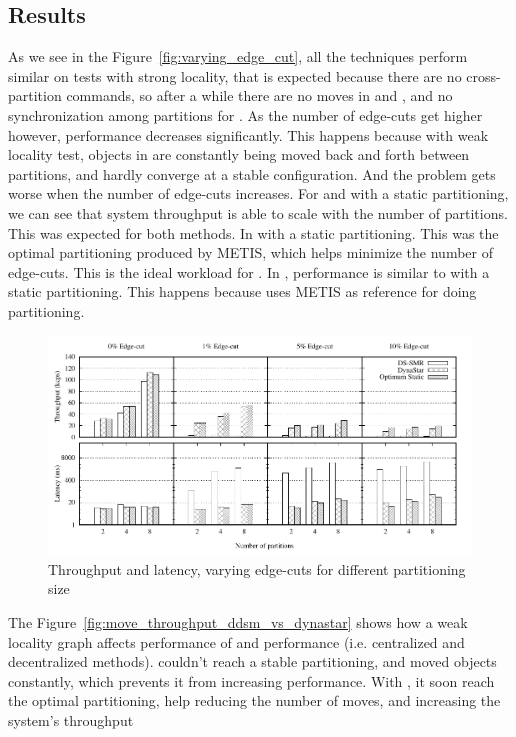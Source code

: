 \subsection{Results}
As we see in the Figure~\ref{fig:varying_edge_cut}, all the techniques perform similar on tests with strong locality, that is
expected because there are no cross-partition commands, so after a while there are no moves in \dynastar and \dssmr, and no
synchronization among partitions for \ssmr.
As the number of edge-cuts get higher however, \dssmr performance decreases significantly.
This happens because with weak locality test, objects in \dssmr are constantly being moved 
back and forth between partitions, and hardly converge at a stable configuration.
And the problem gets worse when the number of edge-cuts increases.
For \dynastar and \ssmr with a static partitioning, we can see that system throughput is able to scale 
with the number of partitions. This was expected for both methods.
In \ssmr with a static partitioning. This was the optimal partitioning produced by METIS, which helps minimize the number of 
edge-cuts. This is the ideal workload for \ssmr{}.
In \dynastar, performance is similar to \ssmr with a static partitioning. This happens because \dynastar uses METIS as 
reference for doing partitioning. 

\begin{figure}[t]
	\includegraphics{figures/experiments/throughput-latency-avg-all}
	\caption{Throughput and latency, varying edge-cuts for different partitioning size}
	\label{fig:latency-avg-all}
\end{figure}

The Figure~\ref{fig:move_throughput_ddsm_vs_dynastar} shows how a weak locality graph affects performance of \dssmr and \dynastar performance (i.e. centralized and decentralized methods). \dssmr couldn't reach a stable partitioning, and moved objects constantly, which prevents it from increasing performance. With \dynastar{}, it soon reach the optimal partitioning, help reducing the number of moves, and increasing the system's throughput

